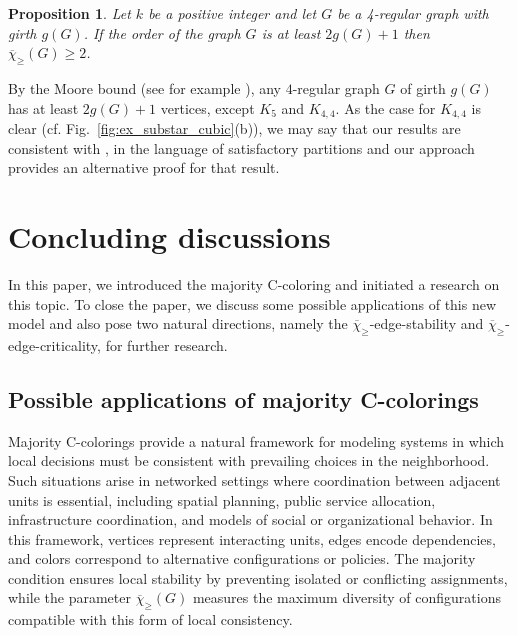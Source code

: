 \documentclass{article}
\newtheorem{proposition}[theorem]{Proposition}
\theoremstyle{definition}
\newcommand{\mc}{\overline{\chi}_{\geqslant}}
\begin{document}
\begin{proposition}
\label{cor:4reg}
       Let $k$ be  a positive integer and let $G$ be a 4-regular graph with girth $g(G)$. If the order of the graph $G$ is at least $2g(G)+1$ then $\mc(G)\geq 2$.
    
\end{proposition}

By the Moore bound (see for example \cite{erdos_moore}), any $4$-regular graph $G$ of girth $g(G)$ has at least
$2g(G)+1$ vertices, except $K_5$ and $K_{4,4}$. As the case for $K_{4,4}$ is clear (cf. Fig.~\ref{fig:ex_substar_cubic}(b)), we may say
that our results are consistent with \cite[Proposition 3]{BTV-06}, in the language of satisfactory partitions and 
our approach 
provides an alternative proof for that result.

\section{Concluding discussions}  \label{sec:final}
In this paper, we introduced the majority C-coloring and initiated a research on this topic. To close the paper, we discuss some possible applications of this new model and also pose two natural directions, namely the $\mc$-edge-stability and $\mc$-edge-criticality, for further research. 
\subsection{Possible applications of majority C-colorings} \label{applications}


Majority C-colorings provide a natural framework for modeling systems in which local decisions must be consistent with prevailing choices in the neighborhood. Such situations arise in networked settings where coordination between adjacent units is essential, including spatial planning, public service allocation, infrastructure coordination, and models of social or organizational behavior. In this framework, vertices represent interacting units, edges encode dependencies, and colors correspond to alternative configurations or policies. The majority condition ensures local stability by preventing isolated or conflicting assignments, while the parameter $\mc(G)$ measures the maximum diversity of configurations compatible with this form of local consistency.
\end{document}
